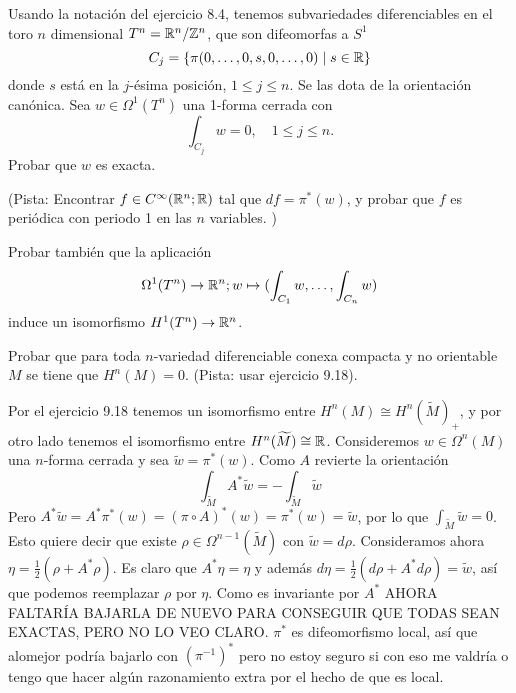 \documentclass[twoside]{article}
\begin{document}
\begin{ejercicio}{10.3}
Usando la notación del ejercicio 8.4, tenemos subvariedades diferenciables en el toro $n$ dimensional $T^n=\mathbb{R}^n/\mathbb{Z}^n$, que son difeomorfas a $S^1$
\[
C_j=\{\pi(0,\dots, 0,s,0,\dots, 0)\mid s\in\mathbb{R}\}
\]
donde $s$ está en la $j$-ésima posición, $1\leq j\leq n$. Se las dota de la orientación canónica. Sea $w\in\Omega^1(T^n)$ una 1-forma cerrada con 
\[
\int_{C_j}w=0,\quad 1\leq j\leq n.
\]
Probar que $w$ es exacta. 

(Pista: Encontrar $f\in C^{\infty}(\mathbb{R}^n;\mathbb{R})$ tal que $df=\pi^*(w)$, y probar que $f$ es periódica con periodo 1 en las $n$ variables. )

Probar también que la aplicación
\[
\Omega^1(T^n)\to\mathbb{R}^n; w\mapsto (\int_{C_1}w,\dots, \int_{C_n}w)
\]
induce un isomorfismo $H^1(T^n)\to\mathbb{R}^n$. 
\end{ejercicio}
\begin{solucion}

\end{solucion}
\newpage

\begin{ejercicio}{10.4}
Probar que para toda $n$-variedad diferenciable conexa compacta y no orientable $M$ se tiene que $H^n(M)=0$. (Pista: usar ejercicio 9.18).
\end{ejercicio}
\begin{solucion}
Por el ejercicio 9.18 tenemos un isomorfismo entre $H^n(M)\cong H^n(\widetilde{M})_+$, y por otro lado tenemos el isomorfismo entre $H^n(\widetilde{M})\cong\mathbb{R}$. Consideremos $w\in\Omega^n(M)$ una $n$-forma cerrada y sea $\tilde{w}=\pi^*(w)$. Como $A$ revierte la orientación
\[
\int_{\widetilde{M}} A^*\tilde{w}=-\int_{\widetilde{M}} \tilde{w}
\]
Pero $A^*\tilde{w}=A^*\pi^*(w)=(\pi\circ A)^*(w)=\pi^*(w)=\tilde{w}$, por lo que $\int_{\widetilde{M}} \tilde{w}=0$. Esto quiere decir que existe $\rho\in\Omega^{n-1}(\widetilde{M})$ con $\tilde{w}=d\rho$. Consideramos ahora $\eta=\frac{1}{2}(\rho+A^*\rho)$. Es claro que $A^*\eta=\eta$ y además $d\eta=\frac{1}{2}(d\rho+A^*d\rho)=\tilde{w}$, así que podemos reemplazar $\rho$ por $\eta$. Como es invariante por $A^*$ AHORA FALTARÍA BAJARLA DE NUEVO PARA CONSEGUIR QUE TODAS SEAN EXACTAS, PERO NO LO VEO CLARO. $\pi^*$ es difeomorfismo local, así que alomejor podría bajarlo con $(\pi^{-1})^*$ pero no estoy seguro si con eso me valdría o tengo que hacer algún razonamiento extra por el hecho de que es local.
\end{solucion}

\newpage
\end{document}
